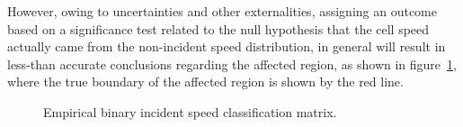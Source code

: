 \documentclass[12pt]{report}
\newcommand{\inputTikZ}[1]{%
  }
\newcommand{\inputTikZ}[1]{%
    \beginpgfgraphicnamed{#1-external}%
    \endpgfgraphicnamed%
  }
\begin{document}
However, owing to uncertainties and other externalities, assigning an
outcome based on a significance test related to the null hypothesis
that the cell speed actually came from the non-incident speed
distribution, in general will result in less-than accurate conclusions
regarding the affected region, as shown in
figure~\ref{fig:incident-speed-classification-binary-dirty}, where the
true boundary of the affected region is shown by the red line.
\begin{figure}[t]
  \begin{center}
    \inputTikZ{figs/time-space-incident-schematic-binary-dirty}
    \caption[Empirical binary incident speed classification
    matrix]{Empirical binary incident speed classification matrix.}
    \label{fig:incident-speed-classification-binary-dirty}
  \end{center}
\end{figure}
\end{document}
